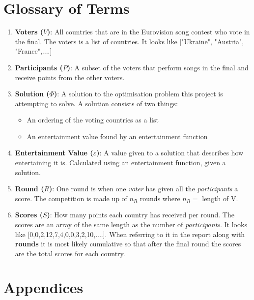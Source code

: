 \documentclass[12pt]{report}
\begin{document}
\section*{Glossary of Terms}\label{glossary}
\begin{enumerate}
\item \textbf{Voters ($V$)}: All countries that are in the Eurovision song contest who vote in the final. The voters is a list of countries. It looks like ["Ukraine", "Austria", "France",....]
\item \textbf{Participants ($P$)}: A subset of the voters that perform songs in the final and receive points from the other voters.
\item \textbf{Solution ($\Phi$)}: A solution to the optimisation problem this project is attempting to solve. A solution consists of two things:
	\begin{itemize}
		\item An ordering of the voting countries as a list
		\item An entertainment value found by an entertainment function
	\end{itemize}
\item \textbf{Entertainment Value ($\varepsilon$)}: A value given to a solution that describes how entertaining it is. Calculated using an entertainment function, given a solution.
\item \textbf{Round ($R$)}: One round is when one \textit{voter} has given all the \textit{participants} a score. The competition is made up of $n_R$ rounds where $n_R = $ length of V.
\item \textbf{Scores ($S$)}: How many points each country has received per round. The scores are an array of the same length as the number of \textit{participants}. It looks like [0,0,2,12,7,4,0,0,3,2,10,....]. When referring to it in the report along with \textbf{rounds} it is most likely cumulative so that after the final round the scores are the total scores for each country.
\end{enumerate}


\section*{Appendices}
\end{document}
